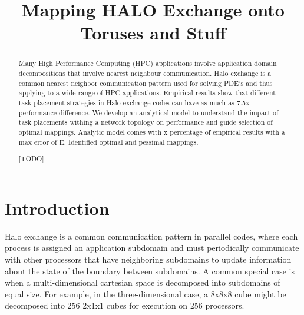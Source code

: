 \documentclass[conference,10pt]{IEEEtran}
\begin{document}
\setlength{\pdfpageheight}{\paperheight}
\setlength{\pdfpagewidth}{\paperwidth}


\title{Mapping HALO Exchange onto Toruses and Stuff}

\author{
}

\maketitle


\begin{abstract}
Many High Performance Computing (HPC) applications involve application domain decompositions that involve nearest neighbour communication.
Halo exchange is a common nearest neighbor communication pattern used for solving PDE's and thus applying to a wide range of HPC applications.
Empirical results show that different task placement strategies in Halo exchange codes can have as much as 7.5x performance difference.
We develop an analytical model to understand the impact of task placements withing a network topology on performance and guide selection of
optimal mappings.
Analytic model comes with x percentage of empirical results with a max error of E.
Identified optimal and pessimal mappings.


[TODO]
\end{abstract}

\section{Introduction}

Halo exchange is a common communication pattern in parallel codes, where
each process is assigned an application subdomain and must periodically
communicate with other processors that have neighboring subdomains to
update information about the state of the boundary between subdomains.
A common special case is when a multi-dimensional cartesian space is
decomposed into subdomains of equal size.  For example, in the three-dimensional
case, a 8x8x8 cube might be decomposed into 256 2x1x1 cubes for execution on 256 processors.
\end{document}
